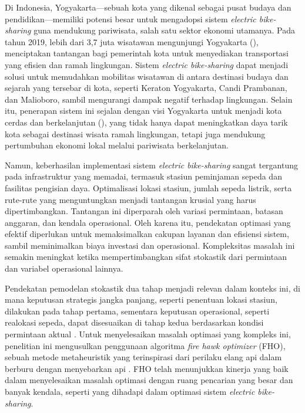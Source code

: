 Di Indonesia, Yogyakarta—sebuah kota yang dikenal sebagai pusat budaya dan pendidikan—memiliki potensi besar untuk mengadopsi sistem \textit{electric bike-sharing} guna mendukung pariwisata, salah satu sektor ekonomi utamanya. Pada tahun 2019, lebih dari 3,7 juta wisatawan mengunjungi Yogyakarta (), menciptakan tantangan bagi pemerintah kota untuk menyediakan transportasi yang efisien dan ramah lingkungan. Sistem \textit{electric bike-sharing} dapat menjadi solusi untuk memudahkan mobilitas wisatawan di antara destinasi budaya dan sejarah yang tersebar di kota, seperti Keraton Yogyakarta, Candi Prambanan, dan Malioboro, sambil mengurangi dampak negatif terhadap lingkungan. Selain itu, penerapan sistem ini sejalan dengan visi Yogyakarta untuk menjadi kota cerdas dan berkelanjutan (), yang tidak hanya dapat meningkatkan daya tarik kota sebagai destinasi wisata ramah lingkungan, tetapi juga mendukung pertumbuhan ekonomi lokal melalui pariwisata berkelanjutan.

Namun, keberhasilan implementasi sistem \textit{electric bike-sharing} sangat tergantung pada infrastruktur yang memadai, termasuk stasiun peminjaman sepeda dan fasilitas pengisian daya. Optimalisasi lokasi stasiun, jumlah sepeda listrik, serta rute-rute yang menguntungkan menjadi tantangan krusial yang harus dipertimbangkan. Tantangan ini diperparah oleh variasi permintaan, batasan anggaran, dan kendala operasional. Oleh karena itu, pendekatan optimasi yang efektif diperlukan untuk memaksimalkan cakupan layanan dan efisiensi sistem, sambil meminimalkan biaya investasi dan operasional. Kompleksitas masalah ini semakin meningkat ketika mempertimbangkan sifat stokastik dari permintaan dan variabel operasional lainnya. 

Pendekatan pemodelan stokastik dua tahap menjadi relevan dalam konteks ini, di mana keputusan strategis jangka panjang, seperti penentuan lokasi stasiun, dilakukan pada tahap pertama, sementara keputusan operasional, seperti realokasi sepeda, dapat disesuaikan di tahap kedua berdasarkan kondisi permintaan aktual . Untuk menyelesaikan masalah optimasi yang kompleks ini, penelitian ini mengusulkan penggunaan algoritma \textit{fire hawk optimizer} (FHO), sebuah metode metaheuristik yang terinspirasi dari perilaku elang api dalam berburu dengan menyebarkan api . FHO telah menunjukkan kinerja yang baik dalam menyelesaikan masalah optimasi dengan ruang pencarian yang besar dan banyak kendala, seperti yang dihadapi dalam optimasi sistem \textit{electric bike-sharing}.

